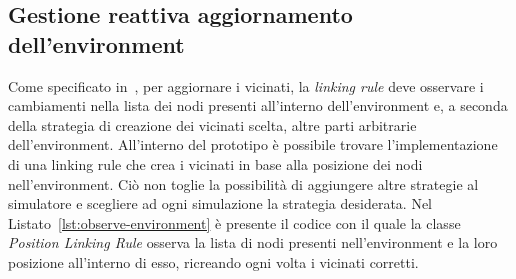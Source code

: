 \documentclass[12pt,a4paper,openright,twoside]{book}
\begin{document}




\subsection{Gestione reattiva aggiornamento dell'environment}
Come specificato in~, per aggiornare i vicinati, la \textit{linking rule} deve osservare i cambiamenti nella lista dei nodi presenti all'interno dell'environment e, a seconda della strategia di creazione dei vicinati scelta, altre parti arbitrarie dell'environment. 
All'interno del prototipo è possibile trovare l'implementazione di una linking rule che crea i vicinati in base alla posizione dei nodi nell'environment. Ciò non toglie la possibilità di aggiungere altre strategie al simulatore e scegliere ad ogni simulazione la strategia desiderata. 
Nel Listato~\ref{lst:observe-environment} è presente il codice con il quale la classe \textit{Position Linking Rule} osserva la lista di nodi presenti nell'environment e la loro posizione all'interno di esso, ricreando ogni volta i vicinati corretti. 


\end{document}
